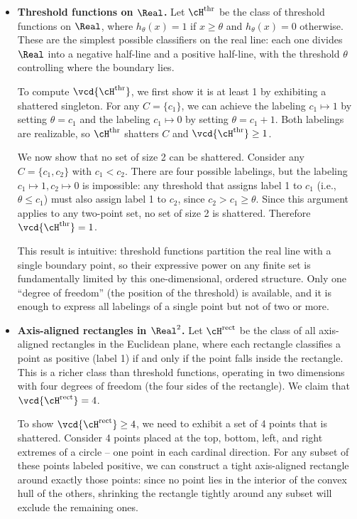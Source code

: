 \begin{itemize}

\item \textbf{Threshold functions on $\Real$.}
Let $\cH^{\text{thr}}$ be the class of threshold functions on $\Real$, where
$h_{\theta}(x)=1$ if $x\geq\theta$ and $h_{\theta}(x)=0$ otherwise. These are the simplest
possible classifiers on the real line: each one divides $\Real$ into a negative half-line and
a positive half-line, with the threshold $\theta$ controlling where the boundary lies.

To compute $\vcd{\cH^{\text{thr}}}$, we first show it is at least 1 by exhibiting a shattered
singleton. For any $C = \{c_1\}$, we can achieve the labeling $c_1 \mapsto 1$ by setting
$\theta = c_1$ and the labeling $c_1 \mapsto 0$ by setting $\theta = c_1 + 1$. Both labelings
are realizable, so $\cH^{\text{thr}}$ shatters $C$ and $\vcd{\cH^{\text{thr}}} \geq 1$.

We now show that no set of size 2 can be shattered. Consider any $C = \{c_1, c_2\}$ with
$c_1 < c_2$. There are four possible labelings, but the labeling $c_1 \mapsto 1, c_2 \mapsto
0$ is impossible: any threshold that assigns label 1 to $c_1$ (i.e., $\theta \leq c_1$) must
also assign label 1 to $c_2$, since $c_2 > c_1 \geq \theta$. Since this argument applies to
any two-point set, no set of size 2 is shattered. Therefore $\vcd{\cH^{\text{thr}}} = 1$.

This result is intuitive: threshold functions partition the real line with a single boundary
point, so their expressive power on any finite set is fundamentally limited by this
one-dimensional, ordered structure. Only one ``degree of freedom'' (the position of the
threshold) is available, and it is enough to express all labelings of a single point but not
of two or more.

\item \textbf{Axis-aligned rectangles in $\Real^2$.}
Let $\cH^{\text{rect}}$ be the class of all axis-aligned rectangles in the Euclidean plane,
where each rectangle classifies a point as positive (label 1) if and only if the point falls
inside the rectangle. This is a richer class than threshold functions, operating in two
dimensions with four degrees of freedom (the four sides of the rectangle). We claim that
$\vcd{\cH^{\text{rect}}} = 4$.

To show $\vcd{\cH^{\text{rect}}} \geq 4$, we need to exhibit a set of 4 points that is
shattered. Consider 4 points placed at the top, bottom, left, and right extremes of a circle
-- one point in each cardinal direction. For any subset of these points labeled positive, we
can construct a tight axis-aligned rectangle around exactly those points: since no point lies
in the interior of the convex hull of the others, shrinking the rectangle tightly around any
subset will exclude the remaining ones.


\end{itemize}
